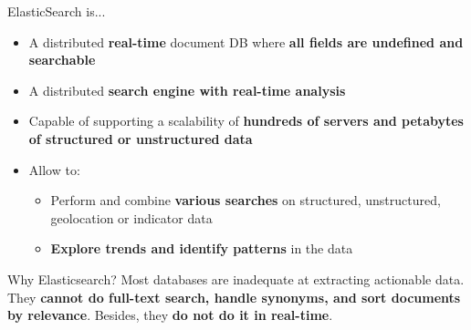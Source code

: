 \documentclass{beamer}[10pt, usepdftitle=false handout]
\begin{document}
\begin{frame}
ElasticSearch is...
\vspace*{0.6em}

\begin{itemize}
\item{A distributed \textbf{real-time} document DB where \textbf{all fields are undefined and searchable}}
\item{A distributed \textbf{search engine with real-time analysis}}
\item{Capable of supporting a scalability of \textbf{hundreds of servers and petabytes of structured or unstructured data}}
\item{Allow to:
	\begin{itemize}
		\item{Perform and combine \textbf{various searches} on structured, unstructured, geolocation or indicator data}
		\item{\textbf{Explore trends and identify patterns} in the data}
	\end{itemize}
}
\end{itemize}

\begin{block}{Why Elasticsearch?}
Most databases are inadequate at extracting actionable data. They \textbf{cannot do full-text search, handle synonyms, and sort documents by relevance}. Besides, they \textbf{do not do it in real-time}.
\end{block}

\end{frame}
\end{document}
